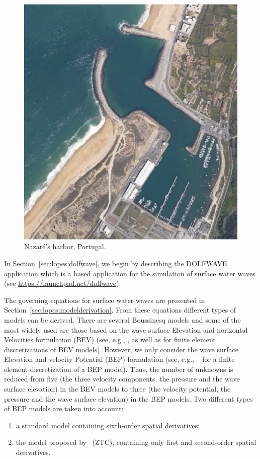 \begin{figure}
\bwfig
  \centering
  \includegraphics[width=\smallfig]{chapters/lopes/pdf/nazare1.pdf}
  \caption{Nazar\'{e}'s harbor, Portugal.}
  \label{fig:lopes:harbor}
\end{figure}

In Section~\ref{sec:lopes:dolfwave}, we begin by describing the
DOLFWAVE application which is a \fenics based application for the
simulation of surface water waves (see
\url{https://launchpad.net/dolfwave}).

The governing equations for surface water waves are presented in
Section~\ref{sec:lopes:modelderivation}. From these equations
different types of models can be derived. There are several Boussinesq
models and some of the most widely used are those based on the wave
surface Elevation and horizontal Velocities formulation (BEV) (see,
e.g., \citet{WalkleyBerzins2002}, \citet{WooLiu2004a} as well as
\citet{WooLiu2004b} for finite element discretizations of BEV models).
However, we only consider the wave surface Elevation and velocity
Potential (BEP) formulation (see, e.g.,
~\citet{LangtangenPedersen1998} for a finite element discretization of
a BEP model).  Thus, the number of unknowns is reduced from five (the
three velocity components, the pressure and the wave surface
elevation) in the BEV models to three (the velocity potential, the
pressure and the wave surface elevation) in the BEP models. Two
different types of BEP models are taken into account:
\begin{enumerate}
\item \label{lopes:i}  a standard  model containing sixth-order
  spatial derivatives;
\item the  model proposed by~\citet{ZhaoTengCheng2004} (ZTC),
 containing only first and second-order spatial derivatives.
\end{enumerate}

